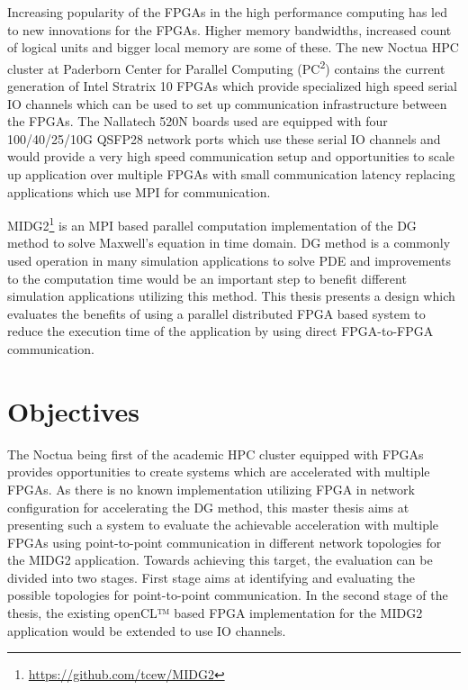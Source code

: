 Increasing popularity of the FPGAs in the high performance computing has led to new innovations for
the FPGAs. Higher memory bandwidths, increased count of logical units and bigger local memory
are some of these. The new Noctua \ac{HPC} cluster at Paderborn Center for Parallel
Computing (PC\textsuperscript{2}) contains the current generation of Intel Stratrix 10 FPGAs which provide
specialized high speed serial IO channels which can be used to set up communication infrastructure
between the FPGAs. The Nallatech 520N boards used are equipped with four 100/40/25/10G
QSFP28 network ports which use these serial IO channels and would provide a very high speed
communication setup and opportunities to scale up application over multiple FPGAs with small
communication latency replacing applications which use MPI for communication.

MIDG2\footnote{\url{https://github.com/tcew/MIDG2}} is an MPI based parallel computation
implementation of the \ac{DG} \cite{hesthaven_nodal_2008} method to solve Maxwell’s equation
in time domain. \ac{DG} method is a commonly used operation in many simulation applications to
solve \ac{PDE} and improvements to the computation time would be an important step to
benefit different simulation applications utilizing this method. This thesis presents
a design which evaluates the benefits of using a parallel distributed FPGA based system
to reduce the execution time of the application by using direct FPGA-to-FPGA communication.

\section{Objectives}

The Noctua being first of the academic \ac{HPC} cluster equipped with FPGAs provides
opportunities to create systems which are accelerated with multiple FPGAs. As there is
no known implementation utilizing FPGA in network configuration for accelerating the
DG method, this master thesis aims at presenting such a system to evaluate
the achievable acceleration with multiple FPGAs using point-to-point communication in
different network topologies for the MIDG2 application. Towards achieving this target,
the evaluation can be divided into two stages. First stage aims at identifying
and evaluating the possible topologies for point-to-point communication. In the second
stage of the thesis, the existing openCL™ based FPGA implementation for
the MIDG2 application would be extended to use IO channels.

